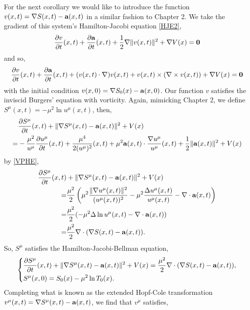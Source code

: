 \documentclass[a4paper,12pt,draft]{report}
\theoremstyle{remark}
\theoremstyle{definition}
\begin{document}
For the next corollary we would like to introduce the function $v(x, t) = \nabla S(x, t) - \bold{a}(x, t)$ in a similar fashion to Chapter 2.  We take the gradient of this system's Hamilton-Jacobi equation \eqref{HJE2},
$$
\frac{\partial v}{\partial t}(x, t) + \frac{\partial \bold{a}}{\partial t}(x, t) + \frac{1}{2}\nabla\|v(x, t)\|^2 + \nabla V(x) = \bold{0}
$$
and so,
\begin{equation}
\frac{\partial v}{\partial t}(x, t) + \frac{\partial \bold{a}}{\partial t}(x, t) + (v(x, t)\cdot\nabla)v(x, t) + v(x, t)\times(\nabla\times v(x, t)) + \nabla V(x) = \bold{0} \label{IBE}
\end{equation}
with the initial condition $v(x, 0) = \nabla S_0(x) - \bold{a}(x, 0)$.  Our function $v$ satisfies the inviscid Burgers' equation with vorticity.  Again, mimicking Chapter 2, we define $S^\mu(x, t) = -\mu^2\ln u^\mu(x, t)$, then,
\begin{align}
& \frac{\partial S^\mu}{\partial t}(x, t) + \|\nabla S^\mu(x, t) - \bold{a}(x, t)\|^2 + V(x)\nonumber\\
= & -\frac{\mu^2}{u^\mu}\frac{\partial u^\mu}{\partial t}(x, t) + \frac{\mu^4}{2(u^\mu)^2}(x, t) + \mu^2\bold{a}(x, t)\cdot\frac{\nabla u^\mu}{u^\mu}(x, t) + \frac{1}{2}\|\bold{a}(x, t)\|^2 + V(x)\nonumber
\end{align}
by \eqref{VPHE},
\begin{align}
\frac{\partial S^\mu}{\partial t}(x, t) & + \|\nabla S^\mu(x, t) - \bold{a}(x, t)\|^2 + V(x)\nonumber\\
= & \frac{\mu^2}{2}\left(\mu^2\frac{\|\nabla u^\mu(x, t)\|^2}{(u^\mu(x, t))^2} - \mu^2\frac{\Delta u^\mu(x, t)}{u^\mu(x, t)} - \nabla\cdot\bold{a}(x, t)\right)\nonumber\\
= & \frac{\mu^2}{2}(-\mu^2\Delta\ln u^\mu(x, t) - \nabla\cdot\bold{a}(x, t))\nonumber\\
= & \frac{\mu^2}{2}\nabla\cdot(\nabla S(x, t) - \bold{a}(x, t)).\nonumber
\end{align}
So, $S^\mu$ satisfies the Hamilton-Jacobi-Bellman equation,
\begin{equation}
\left\{
\begin{aligned}
& \frac{\partial S^\mu}{\partial t}(x, t) + \|\nabla S^\mu(x, t) - \bold{a}(x, t)\|^2 + V(x) = \frac{\mu^2}{2}\nabla\cdot(\nabla S(x, t) - \bold{a}(x, t)),\\
& S^\mu(x, 0) = S_0(x) - \mu^2\ln T_0(x).
\end{aligned}
\right.
\end{equation}
Completing what is known as the extended Hopf-Cole transformation\\$v^\mu(x, t) = \nabla S^\mu(x, t) - \bold{a}(x, t)$, we find that $v^\mu$ satisfies,
\end{document}
